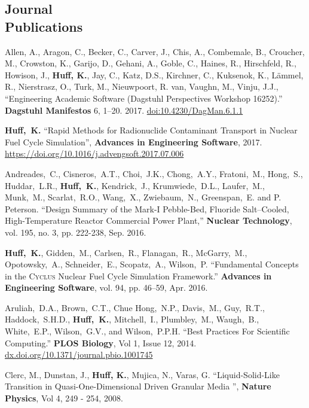 \documentclass[margin,line]{resume}
\newcommand{\Cyclus}{\textsc{Cyclus}\xspace}%
\begin{document}
\begin{resume}
    \section{\mysidestyle Journal\\Publications}
      \begin{bibenum}
      \item Allen, A., Aragon, C., Becker, C., Carver, J., Chis, A., Combemale, B., Croucher, M., Crowston, K., Garijo, D., Gehani, A., Goble, C., Haines, R., Hirschfeld, R., Howison, J., \textbf{Huff, K.}, Jay, C., Katz, D.S., Kirchner, C., Kuksenok, K., L\"{a}mmel, R., Nierstrasz, O., Turk, M., Nieuwpoort, R. van, Vaughn, M., Vinju, J.J., ``Engineering Academic Software (Dagstuhl Perspectives Workshop 16252).'' \textbf{Dagstuhl Manifestos} 6, 1–20. 2017. \url{doi:10.4230/DagMan.6.1.1}
       \item \textbf{Huff,~K.} ``Rapid Methods for Radionuclide Contaminant
       Transport in Nuclear Fuel Cycle Simulation'', \textbf{Advances in 
       Engineering Software}, 2017. \url{https://doi.org/10.1016/j.advengsoft.2017.07.006}
      \item Andreades,~C., Cisneros,~A.T., Choi,~J.K., Chong,~A.Y., 
              Fratoni,~M., Hong,~S., Huddar,~L.R., \textbf{Huff,~K.}, Kendrick,~J., 
              Krumwiede,~D.L., Laufer,~M., Munk,~M., Scarlat,~R.O., Wang,~X., 
              Zwiebaum,~N., Greenspan,~E. and P. Peterson.  ``Design Summary of 
              the Mark-I Pebble-Bed, Fluoride Salt–Cooled, High-Temperature 
              Reactor Commercial Power Plant,'' \textbf{Nuclear Technology}, vol. 195, 
              no. 3, pp. 222-238, Sep. 2016.
       \item \textbf{Huff,~K.}, Gidden,~M., Carlsen,~R., Flanagan,~R.,
       McGarry,~M., Opotowsky,~A., Schneider,~E.,
       Scopatz,~A., Wilson,~P.  ``Fundamental Concepts in the \Cyclus Nuclear Fuel Cycle
       Simulation Framework.'' \textbf{Advances in Engineering Software}, vol. 94, pp. 46–59, Apr. 2016.
       \item Aruliah,~D.A., Brown,~C.T., Chue Hong,~N.P., Davis,~M., Guy,~R.T.,
          Haddock,~S.H.D., \textbf{Huff,~K.}, Mitchell,~I., Plumbley,~M., Waugh,~B.,
          White,~E.P., Wilson,~G.V., and Wilson,~P.P.H.  ``Best Practices For
          Scientific Computing.'' \textbf{PLOS Biology}, Vol 1, Issue 12,
          2014. \url{dx.doi.org/10.1371/journal.pbio.1001745}
       \item Clerc, M., Dunstan, J., \textbf{Huff, K.}, Mujica, N., Varas, G.
          ``Liquid-Solid-Like Transition in Quasi-One-Dimensional Driven
          Granular Media '',  \textbf{Nature Physics}, Vol 4, 249 - 254, 2008.
      \end{bibenum}

\end{resume}
\end{document}
